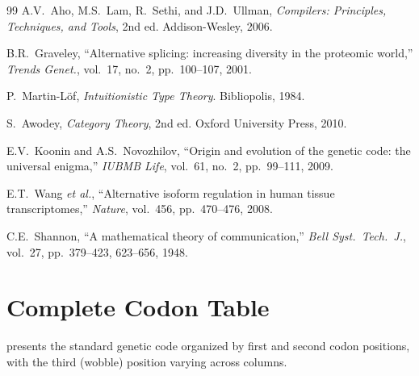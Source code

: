 \documentclass[12pt,a4paper]{article}
\theoremstyle{definition}
\begin{document}
\begin{thebibliography}{99}
A.V.\ Aho, M.S.\ Lam, R.\ Sethi, and J.D.\ Ullman,
\textit{Compilers: Principles, Techniques, and Tools}, 2nd ed.
Addison-Wesley, 2006.

B.R.\ Graveley,
``Alternative splicing: increasing diversity in the proteomic world,''
\textit{Trends Genet.}, vol.\ 17, no.\ 2, pp.\ 100--107, 2001.

P.\ Martin-L\"{o}f,
\textit{Intuitionistic Type Theory}.
Bibliopolis, 1984.

S.\ Awodey,
\textit{Category Theory}, 2nd ed.
Oxford University Press, 2010.

E.V.\ Koonin and A.S.\ Novozhilov,
``Origin and evolution of the genetic code: the universal enigma,''
\textit{IUBMB Life}, vol.\ 61, no.\ 2, pp.\ 99--111, 2009.

E.T.\ Wang \textit{et al.},
``Alternative isoform regulation in human tissue transcriptomes,''
\textit{Nature}, vol.\ 456, pp.\ 470--476, 2008.

C.E.\ Shannon,
``A mathematical theory of communication,''
\textit{Bell Syst.\ Tech.\ J.}, vol.\ 27, pp.\ 379--423, 623--656, 1948.

\end{thebibliography}

\newpage
\appendix

\section{Complete Codon Table}\label{app:codon-table}

 presents the standard genetic code organized by first and second codon positions, with the third (wobble) position varying across columns.
\end{document}
